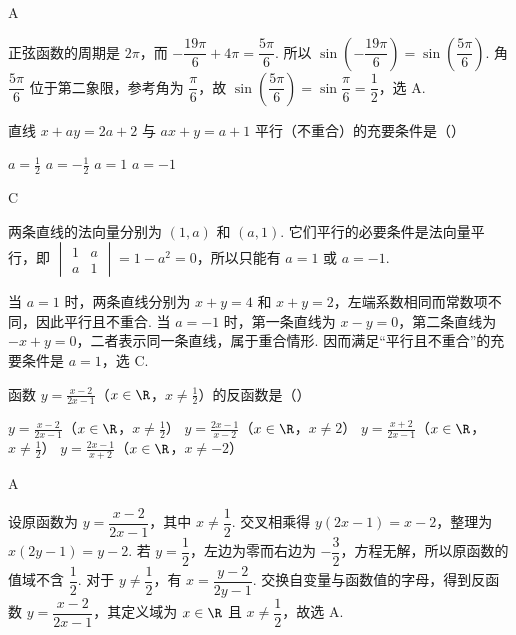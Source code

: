 \begin{answer}
A
\end{answer}

\begin{solution}
正弦函数的周期是 \(2\pi\)，而
\(-\dfrac{19\pi}{6}+4\pi=\dfrac{5\pi}{6}\). 所以
\(\sin\left(-\dfrac{19\pi}{6}\right)=\sin\left(\dfrac{5\pi}{6}\right)\). 角 \(\dfrac{5\pi}{6}\) 位于第二象限，参考角为 \(\dfrac\pi6\)，故
\(\sin\left(\dfrac{5\pi}{6}\right)=\sin\dfrac\pi6=\dfrac12\)，选 A.
\end{solution}

\begin{problem}
直线 \(x+ay = 2a+2\) 与 \(ax+y = a+1\) 平行（不重合）的充要条件是（\quad）

\choices
    {\(a = \frac{1}{2}\)}
    {\(a = -\frac{1}{2}\)}
    {\(a = 1\)}
    {\(a = -1\)}
\end{problem}

\begin{answer}
C
\end{answer}

\begin{solution}
两条直线的法向量分别为 \(\left(1,a\right)\) 和 \(\left(a,1\right)\). 它们平行的必要条件是法向量平行，即
\(\begin{vmatrix}1&a\\a&1\end{vmatrix}=1-a^2=0\)，所以只能有 \(a=1\) 或 \(a=-1\).

当 \(a=1\) 时，两条直线分别为 \(x+y=4\) 和 \(x+y=2\)，左端系数相同而常数项不同，因此平行且不重合. 当 \(a=-1\) 时，第一条直线为 \(x-y=0\)，第二条直线为 \(-x+y=0\)，二者表示同一条直线，属于重合情形. 因而满足“平行且不重合”的充要条件是 \(a=1\)，选 C.
\end{solution}

\begin{problem}
函数 \(y = \frac{x-2}{2x-1}\)（\(x \in \R\)，\(x \neq \frac{1}{2}\)）的反函数是（\quad）

\choices
    {\(y = \frac{x-2}{2x-1}\)（\(x \in \R\)，\(x \neq \frac{1}{2}\)）}
    {\(y = \frac{2x-1}{x-2}\)（\(x \in \R\)，\(x \neq 2\)）}
    {\(y = \frac{x+2}{2x-1}\)（\(x \in \R\)，\(x \neq \frac{1}{2}\)）}
    {\(y = \frac{2x-1}{x+2}\)（\(x \in \R\)，\(x \neq -2\)）}
\end{problem}

\begin{answer}
A
\end{answer}

\begin{solution}
设原函数为 \(y=\dfrac{x-2}{2x-1}\)，其中 \(x\ne\dfrac12\). 交叉相乘得
\(y\left(2x-1\right)=x-2\)，整理为 \(x\left(2y-1\right)=y-2\). 若 \(y=\dfrac12\)，左边为零而右边为 \(-\dfrac32\)，方程无解，所以原函数的值域不含 \(\dfrac12\). 对于 \(y\ne\dfrac12\)，有
\(x=\dfrac{y-2}{2y-1}\). 交换自变量与函数值的字母，得到反函数
\(y=\dfrac{x-2}{2x-1}\)，其定义域为 \(x\in\R\) 且 \(x\ne\dfrac12\)，故选 A.
\end{solution}

